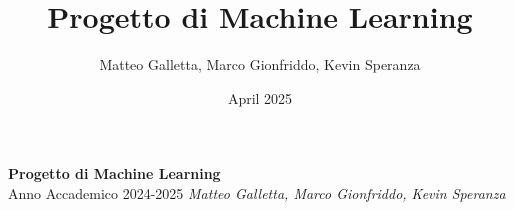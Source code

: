 \documentclass[12pt,a4paper,openany,oneside]{book}
\title{Progetto di Machine Learning}
\author{Matteo Galletta, Marco Gionfriddo, Kevin Speranza}
\date{April 2025}
\begin{document}
\begin{titlepage}
    \centering
    \vspace*{3cm}
    {\Huge \textbf{Progetto di Machine Learning}}\\[1.5cm]
    {\Large Anno Accademico 2024-2025}
    \vfill
    \normalsize{\textit{Matteo Galletta, Marco Gionfriddo, Kevin Speranza}}
\end{titlepage}
\tableofcontents
\newpage
{}








\end{document}
